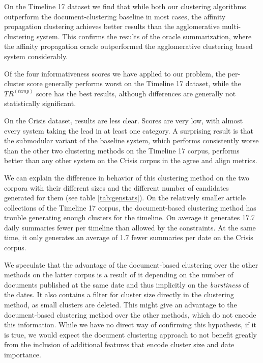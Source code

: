 \documentclass[a4paper,BCOR=10mm]{report}
\numberwithin{lemma}{chapter}
\numberwithin{definition}{chapter}
\begin{document}
On the Timeline 17 dataset we find that while both our clustering algorithms outperform the document-clustering baseline in most cases, the affinity propagation clustering achieves better results than the agglomerative multi-clustering system. This confirms the results of the oracle summarization, where the affinity propagation oracle outperformed the agglomerative clustering based system considerably.

Of the four informativeness scores we have applied to our problem, the per-cluster score generally performs worst on the Timeline 17 dataset, while the $TR^{(temp)}$ score has the best results, although differences are generally not statistically significant.

On the Crisis dataset, results are less clear.
Scores are very low, with almost every system taking the lead in at least one category.
A surprising result is that the submodular variant of the baseline system, which performs consistently worse than the other two clustering methods on the Timeline 17 corpus, performs better than any other system on the Crisis corpus in the agree and align metrics.

We can explain the difference in behavior of this clustering method on the two corpora with their different sizes and the different number of candidates generated for them (see table \ref{tab:genstats}).
On the relatively smaller article collections of the Timeline 17 corpus, the document-based clustering method has trouble generating enough clusters for the timeline.
On average it generates 17.7 daily summaries fewer per timeline than allowed by the constraints. At the same time, it only generates an average of 1.7 fewer summaries per date on the Crisis corpus.

We speculate that the advantage of the document-based clustering over the other methods on the latter corpus is a result of it depending on the number of documents published at the same date and thus implicitly on the \textit{burstiness} of the dates. It also contains a filter for cluster size directly in the clustering method, as small clusters are deleted. This might give an advantage to the document-based clustering method over the other methods, which do not encode this information.
While we have no direct way of confirming this hypothesis, if it is true, we would expect the document clustering approach to not benefit greatly from the inclusion of additional features that encode cluster size and date importance.


\end{document}
